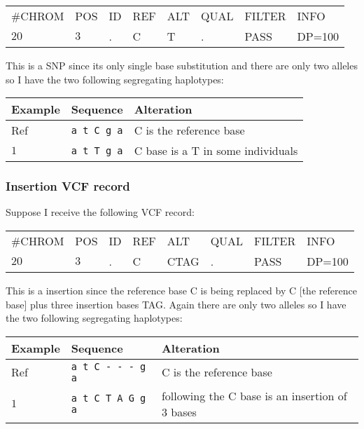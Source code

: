\documentclass[8pt]{article}
\begin{document}
\vspace{0.3cm}
\begin{tabular}{ l l l l l l l l}
	\#CHROM & POS & ID & REF & ALT & QUAL & FILTER & INFO \\
	$20$ & $3$ & . & C & T & . & PASS & DP=100 \\
\end{tabular}
\vspace{0.3cm}

This is a SNP since its only single base substitution and there are only two alleles so I have the two following segregating haplotypes:

\vspace{0.3cm}
\begin{tabular}{ | l | l | l | }
\hline
Example & Sequence & Alteration \\ \hline
Ref & \verb|a t C g a| & C is the reference base \\ \hline
$1$ & \verb|a t T g a| & C base is a T in some individuals \\ \hline
\end{tabular}

\subsubsection{Insertion VCF record}
Suppose I receive the following VCF record:

\vspace{0.3cm}
\begin{tabular}{ l l l l l l l l}
	\#CHROM & POS & ID & REF & ALT & QUAL & FILTER & INFO \\
	$20$ & $3$ & . & C & CTAG & . & PASS & DP=100 \\
\end{tabular}
\vspace{0.3cm}

This is a insertion since the reference base C is being replaced by C [the reference base] plus three insertion bases TAG. Again there are only two alleles so I have the two following segregating haplotypes:

\vspace{0.3cm}
\begin{tabular}{ | l | l | l | }
\hline
Example & Sequence & Alteration \\ \hline
Ref & \verb|a t C - - - g a| & C is the reference base \\ \hline
$1$ & \verb|a t C T A G g a| & following the C base is an insertion of 3 bases \\ \hline
\end{tabular}
\end{document}
